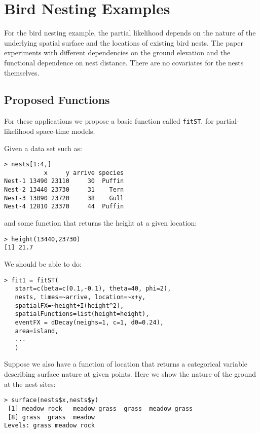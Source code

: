 \documentclass{article}
\begin{document}
\section*{Bird Nesting Examples}

For the bird nesting example, the partial likelihood depends on the nature of the underlying spatial surface 
and the locations of existing bird nests. The paper experiments with different dependencies on the 
ground elevation and the functional dependence on nest distance. There are no covariates for the nests 
themselves.

\subsection*{Proposed Functions}

For these applications we propose a basic function called \verb|fitST|, for partial-likelihood space-time
models.

Given a data set such as:

\begin{verbatim}
> nests[1:4,]
           x     y arrive species
Nest-1 13490 23110     30  Puffin
Nest-2 13440 23730     31    Tern
Nest-3 13090 23720     38    Gull
Nest-4 12810 23370     44  Puffin
\end{verbatim}

and some function that returns the height at a given location:

\begin{verbatim}
> height(13440,23730)
[1] 21.7
\end{verbatim}

We should be able to do:

\begin{verbatim}
> fit1 = fitST(
   start=c(beta=c(0.1,-0.1), theta=40, phi=2),
   nests, times=~arrive, location=~x+y,
   spatialFX=~height+I(height^2), 
   spatialFunctions=list(height=height),
   eventFX = dDecay(neighs=1, c=1, d0=0.24),
   area=island,
   ...
   )
\end{verbatim}

Suppose we also have a function of location that returns a categorical variable describing surface nature at given points.
Here we show the nature of the ground at the nest sites:

\begin{verbatim}
> surface(nests$x,nests$y)
 [1] meadow rock   meadow grass  grass  meadow grass
 [8] grass  grass  meadow
Levels: grass meadow rock
\end{verbatim}
\end{document}
